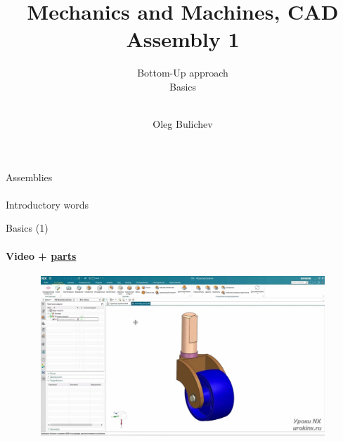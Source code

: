 \documentclass[aspectratio=169]{beamer}
\title[MaM]{Mechanics and Machines, CAD Assembly 1} %
\subtitle{Bottom-Up approach
\\ Basics \\ \ 
         } %
\author{Oleg Bulichev}
\newcommand{\fbckg}[1]{\usebackgroundtemplate{\texttt{[image: \#1]}}}%
\begin{document}
\setlength{\abovedisplayskip}{0pt}
\setlength{\belowdisplayskip}{0pt}
\setlength{\abovedisplayshortskip}{0pt}
\setlength{\belowdisplayshortskip}{0pt}

\fbckg{fibeamer/figs/title_page.png}

\fbckg{fibeamer/figs/common.png}

\note{\scriptsize \begin{itemize}
        \item \
    \end{itemize}}

\note{
   \ 
}

\begin{frame}[c]{Assemblies}
\framesubtitle{}
    \centering
    \Huge
    Introductory words
\end{frame}

\begin{frame}[t]{Basics (1)}
    \framesubtitle{Video + \href{https://disk.yandex.ru/d/7ZBj1dYl2SWxjA}{parts}}
    \vspace{-0.6cm}
    \begin{figure}[H]
        \href{https://disk.yandex.ru/i/eTpcseXL44F6jQ}{
            \centering\includegraphics[height=6cm,width=1\textwidth,keepaspectratio]{1.png}}
        \label{fig:1}
    \end{figure}
\end{frame}
\end{document}
